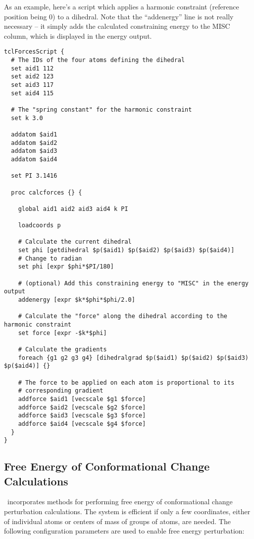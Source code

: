 As an example, here's a script which applies a harmonic
constraint (reference position being 0) to a dihedral. Note that
the ``addenergy'' line is not really necessary -- it simply adds
the calculated constraining energy to the MISC column, which is
displayed in the energy output.

\begin{verbatim}
tclForcesScript {
  # The IDs of the four atoms defining the dihedral
  set aid1 112
  set aid2 123
  set aid3 117
  set aid4 115
  
  # The "spring constant" for the harmonic constraint
  set k 3.0
  
  addatom $aid1
  addatom $aid2
  addatom $aid3
  addatom $aid4
  
  set PI 3.1416
  
  proc calcforces {} {
  
    global aid1 aid2 aid3 aid4 k PI
    
    loadcoords p
    
    # Calculate the current dihedral
    set phi [getdihedral $p($aid1) $p($aid2) $p($aid3) $p($aid4)]
    # Change to radian
    set phi [expr $phi*$PI/180]
    
    # (optional) Add this constraining energy to "MISC" in the energy output
    addenergy [expr $k*$phi*$phi/2.0]
    
    # Calculate the "force" along the dihedral according to the harmonic constraint
    set force [expr -$k*$phi]
    
    # Calculate the gradients
    foreach {g1 g2 g3 g4} [dihedralgrad $p($aid1) $p($aid2) $p($aid3) $p($aid4)] {}
    
    # The force to be applied on each atom is proportional to its
    # corresponding gradient
    addforce $aid1 [vecscale $g1 $force]
    addforce $aid2 [vecscale $g2 $force]
    addforce $aid3 [vecscale $g3 $force]
    addforce $aid4 [vecscale $g4 $force]
  }
}
\end{verbatim}

\subsection{Free Energy of Conformational Change Calculations}
\label{section:fenergy}

\NAMD\ incorporates methods for performing free energy of conformational change perturbation calculations.
The system is efficient if only a few coordinates, either of individual atoms or centers of mass of groups of atoms, are needed.
The following configuration parameters are used to enable free energy perturbation:

